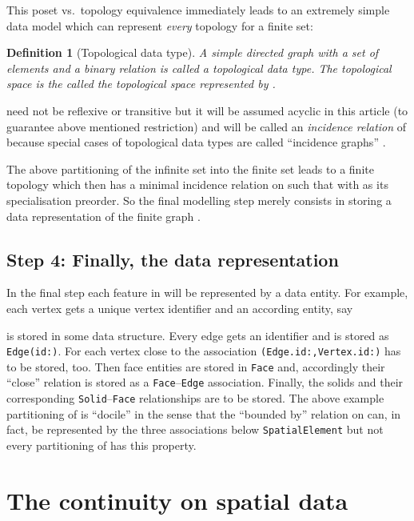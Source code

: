 \documentclass[5p]{elsarticle}
\newtheorem{dfn}{Definition}
\newcommand{\qq}[1]{``#1''}
\begin{document}
This poset vs.\ topology equivalence immediately leads to an extremely simple data model 
which can represent \emph{every} topology for a finite set: 

\begin{dfn}[Topological data type]
A simple directed graph  with a set  of elements and a binary 
relation  is called a \emph{topological data type}. 
The topological space  is the called the topological 
space \emph{represented by} . 
\end{dfn}

 need not be reflexive or transitive but it will be assumed acyclic in 
this article (to guarantee above mentioned  restriction) 
and will be called an \emph{incidence relation} of  because 
special cases of topological data types are called \qq{incidence graphs} 
\cite[p.\ 395]{Brisson:TopologyOrder}. 


The above partitioning of the infinite set  into the finite set  leads to 
a finite topology  which then has a minimal incidence relation  on 
 such that   with  as its specialisation 
preorder. So the final modelling step merely consists in storing a data representation of the 
finite graph . 


\subsection{Step 4: Finally, the data representation}

In the final step each feature in  will be represented by a data entity. 
For example, each vertex  gets a unique vertex identifier 
 and an according entity, say 

is stored in some data structure. 
Every edge gets an identifier  and is stored as 
\texttt{Edge(id:)}. For each vertex  close to  the association 
\texttt{(Edge.id:,Vertex.id:)} has to be stored, too.
Then face entities are stored in \texttt{Face} and, accordingly their \qq{close} 
relation is stored as a \texttt{Face}--\texttt{Edge} association. Finally, the 
solids and their corresponding \texttt{Solid}--\texttt{Face} relationships are to be stored. 
The above example partitioning of  is \qq{docile} in the sense that the \qq{bounded by} 
relation  on  can, in fact, be represented by the three 
associations below \texttt{Spa\-tial\-Ele\-ment} but not every partitioning of  has 
this property. 

\section{The continuity on spatial data}\label{sec:data-topology}
\end{document}
